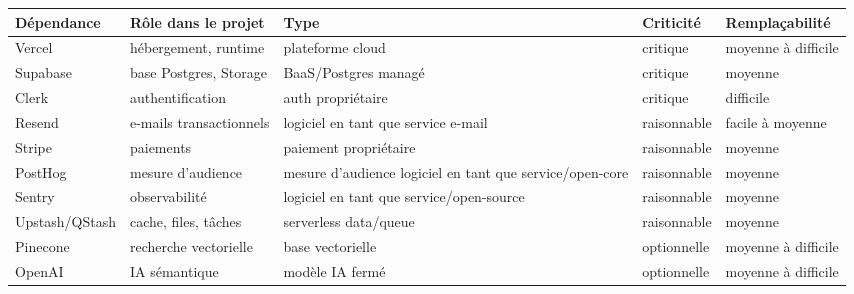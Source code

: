 \documentclass[
  10pt,
  a4paper,
  DIV=11,
  numbers=noendperiod,
  oneside]{scrreprt}
\newcounter{none} %
\begin{document}
{\def\LTcaptype{none} %
\begin{longtable}[]{@{}
  >{\raggedright\arraybackslash}p{}
  >{\raggedright\arraybackslash}p{}
  >{\raggedright\arraybackslash}p{}
  >{\raggedright\arraybackslash}p{}
  >{\raggedright\arraybackslash}p{}@{}}
\toprule\noalign{}
\begin{minipage}[b]{\linewidth}\raggedright
Dépendance
\end{minipage} & \begin{minipage}[b]{\linewidth}\raggedright
Rôle dans le projet
\end{minipage} & \begin{minipage}[b]{\linewidth}\raggedright
Type
\end{minipage} & \begin{minipage}[b]{\linewidth}\raggedright
Criticité
\end{minipage} & \begin{minipage}[b]{\linewidth}\raggedright
Remplaçabilité
\end{minipage} \\
\midrule\noalign{}
\endhead
\bottomrule\noalign{}
\endlastfoot
Vercel & hébergement, runtime & plateforme cloud & critique & moyenne à
difficile \\
Supabase & base Postgres, Storage & BaaS/Postgres managé & critique &
moyenne \\
Clerk & authentification & auth propriétaire & critique & difficile \\
Resend & e-mails transactionnels & logiciel en tant que service e-mail &
raisonnable & facile à moyenne \\
Stripe & paiements & paiement propriétaire & raisonnable & moyenne \\
PostHog & mesure d'audience & mesure d'audience logiciel en tant que
service/open-core & raisonnable & moyenne \\
Sentry & observabilité & logiciel en tant que service/open-source &
raisonnable & moyenne \\
Upstash/QStash & cache, files, tâches & serverless data/queue &
raisonnable & moyenne \\
Pinecone & recherche vectorielle & base vectorielle & optionnelle &
moyenne à difficile \\
OpenAI & IA sémantique & modèle IA fermé & optionnelle & moyenne à
difficile \\
\end{longtable}
}
\end{document}

